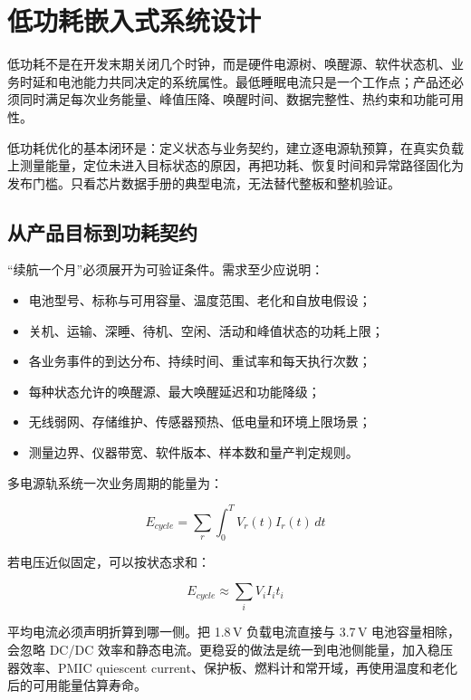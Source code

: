\chapter{低功耗嵌入式系统设计}
\label{chap:low-power-system}

低功耗不是在开发末期关闭几个时钟，而是硬件电源树、唤醒源、软件状态机、业务时延和电池能力共同决定的系统属性。最低睡眠电流只是一个工作点；产品还必须同时满足每次业务能量、峰值压降、唤醒时间、数据完整性、热约束和功能可用性。

低功耗优化的基本闭环是：定义状态与业务契约，建立逐电源轨预算，在真实负载上测量能量，定位未进入目标状态的原因，再把功耗、恢复时间和异常路径固化为发布门槛。只看芯片数据手册的典型电流，无法替代整板和整机验证。

\section{从产品目标到功耗契约}

“续航一个月”必须展开为可验证条件。需求至少应说明：

\begin{itemize}
  \item 电池型号、标称与可用容量、温度范围、老化和自放电假设；
  \item 关机、运输、深睡、待机、空闲、活动和峰值状态的功耗上限；
  \item 各业务事件的到达分布、持续时间、重试率和每天执行次数；
  \item 每种状态允许的唤醒源、最大唤醒延迟和功能降级；
  \item 无线弱网、存储维护、传感器预热、低电量和环境上限场景；
  \item 测量边界、仪器带宽、软件版本、样本数和量产判定规则。
\end{itemize}

多电源轨系统一次业务周期的能量为：

\begin{equation}
  E_{cycle}=\sum_r \int_0^T V_r(t)I_r(t)\,dt
\end{equation}

若电压近似固定，可以按状态求和：

\begin{equation}
  E_{cycle}\approx\sum_i V_i I_i t_i
\end{equation}

平均电流必须声明折算到哪一侧。把 1.8\,V 负载电流直接与 3.7\,V 电池容量相除，会忽略 DC/DC 效率和静态电流。更稳妥的做法是统一到电池侧能量，加入稳压器效率、PMIC quiescent current、保护板、燃料计和常开域，再使用温度和老化后的可用能量估算寿命。

